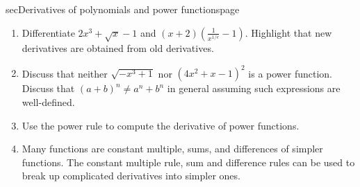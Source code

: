 \documentclass[../main]{subfiles}
\begin{document}
\begin{outline}{sec}{Derivatives of polynomials and power functions}{page}
\begin{enumerate}

    \item Differentiate \(2 x^{3} + \sqrt{x} - 1\) and \((x + 2)\left(\frac{1}{x^{1/e}} - 1\right)\).  Highlight that new derivatives are obtained from old derivatives. 

    \item Discuss that neither \(\sqrt{-x^{3} + 1}\) nor \((4x^{2} + x - 1)^{2}\) is a power function. Discuss that \((a + b)^{n} \ne a^{n} + b^{n}\) in general assuming such expressions are well-defined. 

    \item {Use the power rule to compute the derivative of power functions.}

    \item {Many functions are constant multiple, sums, and differences of simpler functions. The constant multiple rule, sum and difference rules can be used to break up complicated derivatives into simpler ones.}
\end{enumerate}
\end{outline}
\end{document}
